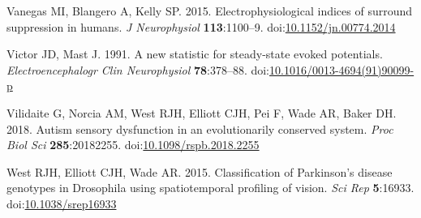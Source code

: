 \documentclass[]{article}
\begin{document}
\leavevmode\hypertarget{ref-Vanegas2015}{}%
Vanegas MI, Blangero A, Kelly SP. 2015. Electrophysiological indices of surround suppression in humans. \emph{J Neurophysiol} \textbf{113}:1100--9. doi:\href{https://doi.org/10.1152/jn.00774.2014}{10.1152/jn.00774.2014}

\leavevmode\hypertarget{ref-Victor1991}{}%
Victor JD, Mast J. 1991. A new statistic for steady-state evoked potentials. \emph{Electroencephalogr Clin Neurophysiol} \textbf{78}:378--88. doi:\href{https://doi.org/10.1016/0013-4694(91)90099-p}{10.1016/0013-4694(91)90099-p}

\leavevmode\hypertarget{ref-Vilidaite2018}{}%
Vilidaite G, Norcia AM, West RJH, Elliott CJH, Pei F, Wade AR, Baker DH. 2018. Autism sensory dysfunction in an evolutionarily conserved system. \emph{Proc Biol Sci} \textbf{285}:20182255. doi:\href{https://doi.org/10.1098/rspb.2018.2255}{10.1098/rspb.2018.2255}

\leavevmode\hypertarget{ref-West2015}{}%
West RJH, Elliott CJH, Wade AR. 2015. Classification of Parkinson's disease genotypes in Drosophila using spatiotemporal profiling of vision. \emph{Sci Rep} \textbf{5}:16933. doi:\href{https://doi.org/10.1038/srep16933}{10.1038/srep16933}
\end{document}
